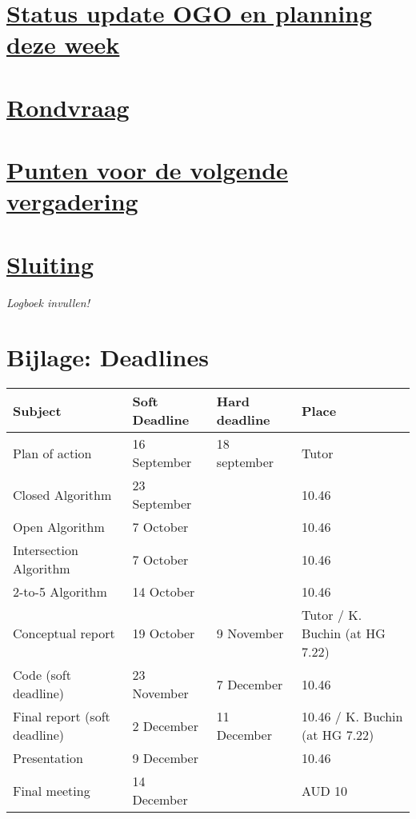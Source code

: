 \documentclass[a4paper]{article}
\begin{document}
\section{\underline{Status update OGO en planning deze week}} %
\label{sec:voortgang_ogo}


\section{\underline{Rondvraag}} %
\label{sec:rondvraag}



\section{\underline{Punten voor de volgende vergadering}} %
\label{sec:punten_voor_de_volgende_vergadering}


\section{\underline{Sluiting}} %
\label{sec:sluiting}
\small{\emph{Logboek invullen!}}

\section{Bijlage: Deadlines} %
\label{sec:bijlage_deadlines}

  \begin{tabular}{|p{5cm}|p{3cm}|p{2.5cm}|p{4cm}|}
      \hline
      \textbf{Subject} & \textbf{Soft Deadline} & \textbf{Hard deadline} & \textbf{Place}\\
      \hline
      \hline
      Plan of action & 16 September & 18 september & Tutor\\
      \hline
      Closed Algorithm & 23 September& & 10.46\\
      \hline
      Open Algorithm & 7 October & & 10.46\\
      \hline
      Intersection Algorithm & 7 October& & 10.46\\
      \hline
      2-to-5 Algorithm & 14 October& & 10.46\\
      \hline
      Conceptual report & 19 October & 9 November& Tutor / K. Buchin (at HG 7.22) \\
      \hline
      Code (soft deadline) & 23 November & 7 December & 10.46\\
      \hline
      Final report (soft deadline) & 2 December & 11 December & 10.46 / K. Buchin (at HG 7.22)\\
      \hline
      Presentation & 9 December & &10.46\\
      \hline
      Final meeting & 14 December & & AUD 10\\
      \hline
  \end{tabular} \\ \\

\end{document}
